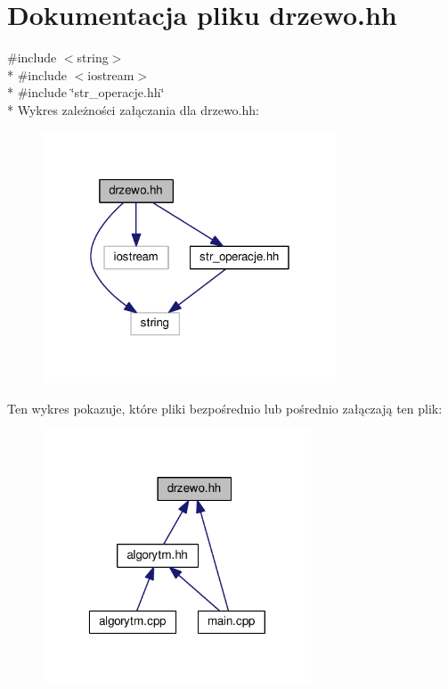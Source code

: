 \hypertarget{drzewo_8hh}{\section{Dokumentacja pliku drzewo.\-hh}
\label{drzewo_8hh}
}
{\ttfamily \#include $<$string$>$}\\*
{\ttfamily \#include $<$iostream$>$}\\*
{\ttfamily \#include \char`\"{}str\-\_\-operacje.\-hh\char`\"{}}\\*
Wykres zależności załączania dla drzewo.\-hh\-:\nopagebreak
\begin{figure}[H]
\begin{center}
\leavevmode
\includegraphics[width=247pt]{drzewo_8hh__incl}
\end{center}
\end{figure}
Ten wykres pokazuje, które pliki bezpośrednio lub pośrednio załączają ten plik\-:\nopagebreak
\begin{figure}[H]
\begin{center}
\leavevmode
\includegraphics[width=226pt]{drzewo_8hh__dep__incl}
\end{center}
\end{figure}
